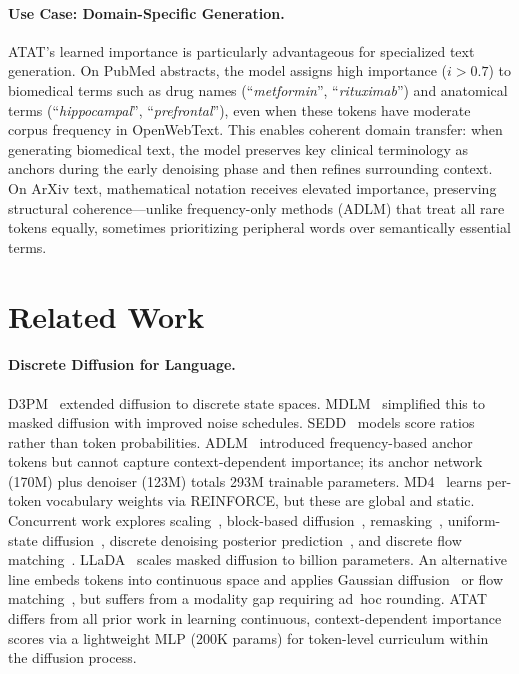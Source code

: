 \documentclass[11pt]{article}
\theoremstyle{remark}
\begin{document}
\paragraph{Use Case: Domain-Specific Generation.} ATAT's learned importance is particularly advantageous for specialized text generation. On PubMed abstracts, the model assigns high importance ($i > 0.7$) to biomedical terms such as drug names (``\textit{metformin}'', ``\textit{rituximab}'') and anatomical terms (``\textit{hippocampal}'', ``\textit{prefrontal}''), even when these tokens have moderate corpus frequency in OpenWebText. This enables coherent domain transfer: when generating biomedical text, the model preserves key clinical terminology as anchors during the early denoising phase and then refines surrounding context. On ArXiv text, mathematical notation receives elevated importance, preserving structural coherence—unlike frequency-only methods (ADLM) that treat all rare tokens equally, sometimes prioritizing peripheral words over semantically essential terms.

\section{Related Work}
\label{sec:related}

\paragraph{Discrete Diffusion for Language.} D3PM~\citep{d3pm} extended diffusion to discrete state spaces. MDLM~\citep{mdlm} simplified this to masked diffusion with improved noise schedules. SEDD~\citep{sedd} models score ratios rather than token probabilities. ADLM~\citep{adlm} introduced frequency-based anchor tokens but cannot capture context-dependent importance; its anchor network (170M) plus denoiser (123M) totals 293M trainable parameters. MD4~\citep{shi2024simplified} learns per-token vocabulary weights via REINFORCE, but these are global and static. Concurrent work explores scaling~\citep{smdm}, block-based diffusion~\citep{bd3lm}, remasking~\citep{remdm}, uniform-state diffusion~\citep{schiff2025udlm,sahoo2025duo}, discrete denoising posterior prediction~\citep{liu2025ddpd}, and discrete flow matching~\citep{gat2024discrete,campbell2024generative}. LLaDA~\citep{llada} scales masked diffusion to billion parameters. An alternative line embeds tokens into continuous space and applies Gaussian diffusion~\citep{li2022diffusion,gong2023diffuseq,gulrajani2024likelihood,dieleman2022continuous} or flow matching~\citep{zhang2024language,hu2024flow}, but suffers from a modality gap requiring ad~hoc rounding. ATAT differs from all prior work in learning continuous, context-dependent importance scores via a lightweight MLP (200K params) for token-level curriculum within the diffusion process.
\end{document}

